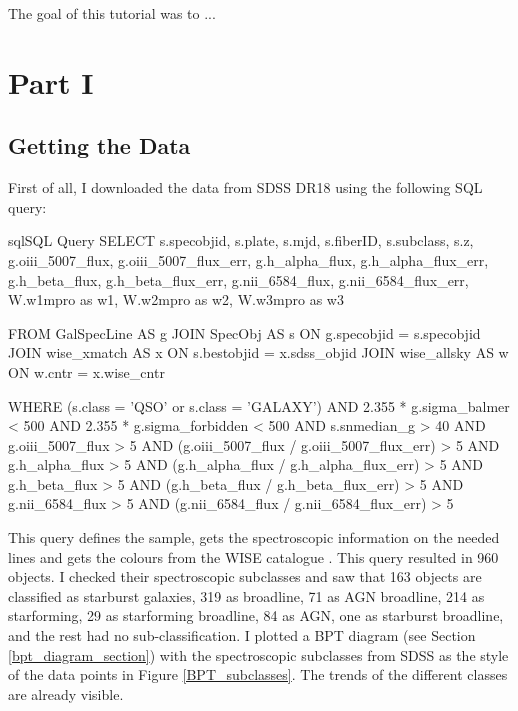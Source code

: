 \documentclass[letterpaper, oneside]{article}
\begin{document}
	
\templatePagecfg


The goal of this tutorial was to ...


\section{Part I}

\subsection{Getting the Data}

First of all, I downloaded the data from SDSS DR18 \cite{sdss_dr18} using the following SQL query:

\begin{sourcecode}[\label{sdss_query}]{sql}{SQL Query}
SELECT s.specobjid, s.plate, s.mjd, s.fiberID, s.subclass, s.z, 
g.oiii_5007_flux, g.oiii_5007_flux_err, 
g.h_alpha_flux, g.h_alpha_flux_err, 
g.h_beta_flux, g.h_beta_flux_err, 
g.nii_6584_flux, g.nii_6584_flux_err, 
W.w1mpro as w1, W.w2mpro as w2, W.w3mpro as w3

FROM GalSpecLine AS g 
JOIN SpecObj AS s ON g.specobjid = s.specobjid
JOIN wise_xmatch AS x ON s.bestobjid = x.sdss_objid
JOIN wise_allsky AS w ON w.cntr = x.wise_cntr

WHERE
(s.class = 'QSO' or s.class = 'GALAXY')
AND 2.355 * g.sigma_balmer < 500
AND 2.355 * g.sigma_forbidden < 500
AND s.snmedian_g > 40
AND g.oiii_5007_flux > 5
AND (g.oiii_5007_flux / g.oiii_5007_flux_err) > 5
AND g.h_alpha_flux > 5
AND (g.h_alpha_flux / g.h_alpha_flux_err) > 5
AND g.h_beta_flux > 5
AND (g.h_beta_flux / g.h_beta_flux_err) > 5
AND g.nii_6584_flux > 5
AND (g.nii_6584_flux / g.nii_6584_flux_err) > 5
\end{sourcecode}

This query defines the sample, gets the spectroscopic information on the needed lines and gets the colours from the WISE catalogue \cite{wise_allsky}. This query resulted in 960 objects. I checked their spectroscopic subclasses and saw that 163 objects are classified as starburst galaxies, 319 as broadline, 71 as AGN broadline, 214 as starforming, 29 as starforming broadline, 84 as AGN, one as starburst broadline, and the rest had no sub-classification. I plotted a BPT diagram (see Section \ref{bpt_diagram_section}) with the spectroscopic subclasses from SDSS as the style of the data points in Figure \ref{BPT_subclasses}. The trends of the different classes are already visible.
\end{document}
